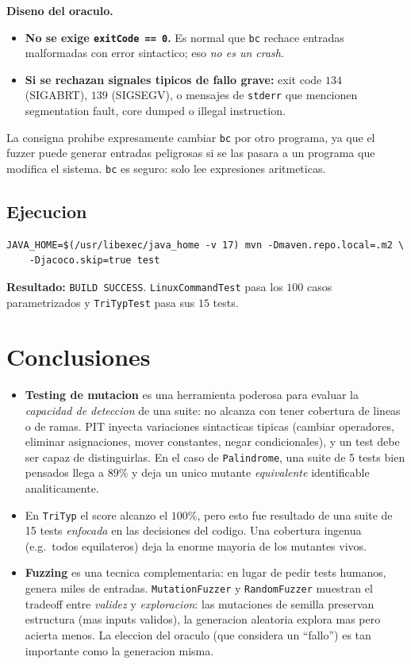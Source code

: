 \documentclass[12pt,a4paper]{article}
\begin{document}
\textbf{Diseno del oraculo.}

\begin{itemize}
  \item \textbf{No se exige \texttt{exitCode == 0}.} Es normal que \texttt{bc} rechace entradas
  malformadas con error sintactico; eso \emph{no es un crash}.
  \item \textbf{Si se rechazan signales tipicos de fallo grave:} exit code $134$ (SIGABRT),
  $139$ (SIGSEGV), o mensajes de \texttt{stderr} que mencionen segmentation fault, core dumped
  o illegal instruction.
\end{itemize}

La consigna prohibe expresamente cambiar \texttt{bc} por otro programa, ya que el fuzzer puede
generar entradas peligrosas si se las pasara a un programa que modifica el sistema. \texttt{bc}
es seguro: solo lee expresiones aritmeticas.

\subsection{Ejecucion}

\begin{lstlisting}[style=codestyle]
JAVA_HOME=$(/usr/libexec/java_home -v 17) mvn -Dmaven.repo.local=.m2 \
    -Djacoco.skip=true test
\end{lstlisting}

\textbf{Resultado:} \texttt{BUILD SUCCESS}. \texttt{LinuxCommandTest} pasa los $100$ casos
parametrizados y \texttt{TriTypTest} pasa sus $15$ tests.

\section*{Conclusiones}

\begin{itemize}
  \item \textbf{Testing de mutacion} es una herramienta poderosa para evaluar la
  \emph{capacidad de deteccion} de una suite: no alcanza con tener cobertura de lineas o de
  ramas. PIT inyecta variaciones sintacticas tipicas (cambiar operadores, eliminar
  asignaciones, mover constantes, negar condicionales), y un test debe ser capaz de
  distinguirlas. En el caso de \texttt{Palindrome}, una suite de 5 tests bien pensados llega a
  $89\%$ y deja un unico mutante \emph{equivalente} identificable analiticamente.
  \item En \texttt{TriTyp} el score alcanzo el $100\%$, pero esto fue resultado de una suite de
  15 tests \emph{enfocada} en las decisiones del codigo. Una cobertura ingenua (e.g.\ todos
  equilateros) deja la enorme mayoria de los mutantes vivos.
  \item \textbf{Fuzzing} es una tecnica complementaria: en lugar de pedir tests humanos, genera
  miles de entradas. \texttt{MutationFuzzer} y \texttt{RandomFuzzer} muestran el tradeoff entre
  \emph{validez} y \emph{exploracion}: las mutaciones de semilla preservan estructura (mas
  inputs validos), la generacion aleatoria explora mas pero acierta menos. La eleccion del
  oraculo (que considera un ``fallo'') es tan importante como la generacion misma.
\end{itemize}
\end{document}
